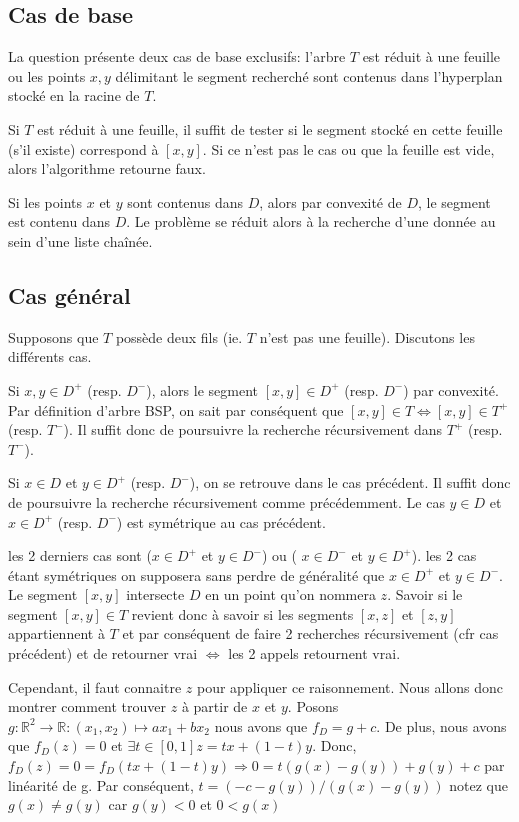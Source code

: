 
\subsection{Cas de base}
La question présente deux cas de base exclusifs: l'arbre $T$ est
réduit à une feuille ou les points $x, y$ délimitant le segment
recherché sont contenus dans l'hyperplan stocké en la racine de $T$.

Si $T$ est réduit à une feuille, il suffit de tester si le segment
stocké en cette feuille (s'il existe) correspond à $[x, y]$. Si ce
n'est pas le cas ou que la feuille est vide, alors l'algorithme
retourne faux.

Si les points $x$ et $y$ sont contenus dans $D$, alors par convexité
de $D$, le segment est contenu dans $D$. Le problème se réduit alors
à la recherche d'une donnée au sein d'une liste chaînée.

\subsection{Cas général}
Supposons que $T$ possède deux fils (ie. $T$ n'est pas une feuille).
Discutons les différents cas.

Si $x,y \in D^+$ (resp. $D^-$), alors le segment $[x,y] \in D^+$ (resp. $D^-$) par convexité.
Par définition d'arbre BSP,
on sait par conséquent que $[x,y] \in T \Leftrightarrow [x,y] \in T^+ $ (resp. $T^-$).
Il suffit donc de poursuivre la recherche récursivement dans $T^+ $ (resp. $T^-$).

Si $x \in D $ et $y \in D^+$ (resp. $D^-$), on se retrouve dans le cas précédent. Il suffit donc de poursuivre la recherche récursivement comme précédemment.
Le cas $y \in D $ et $x \in D^+$ (resp. $D^-$) est symétrique au cas précédent.

les 2 derniers cas sont ($ x \in D^+$ et $ y \in D^-$) ou ( $ x \in D^-$ et $ y \in D^+$). les 2 cas étant symétriques on supposera sans perdre de généralité que $ x \in D^+$ et $ y \in D^-$.
Le segment $[x,y]$ intersecte $D$ en un point qu'on nommera $z$.
Savoir si le segment $[x,y] \in T$ revient donc à savoir si les segments $[x,z]$ et $[z,y]$ appartiennent à $T$ et par conséquent de faire 2 recherches récursivement (cfr cas précédent) et de retourner vrai $\Leftrightarrow $ les 2 appels retournent vrai.

Cependant, il faut connaitre $z$ pour appliquer ce raisonnement. Nous allons donc montrer comment trouver $z$ à partir de $x$ et $y$.
Posons $g: \mathbb{R}^2 \to \mathbb{R}: (x_1, x_2)\mapsto a x_1 + b x_2$
nous avons que $f_D =g + c $.
De plus, nous avons que $f_D(z) = 0$ et $\exists t \in [0,1] z = tx+ (1-t)y$.
Donc, $f_D(z) = 0 = f_D (tx+ (1-t)y) \Rightarrow 0 = t(g(x)-g(y))+g(y)+c$ par linéarité de g.
Par conséquent, $t = (-c - g(y))/(g(x)-g(y))$
notez que $g(x) \neq g(y)$ car $ g(y) < 0 $ et $ 0 < g(x)$ 

